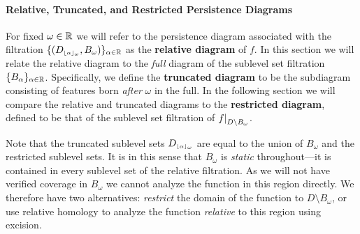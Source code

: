 
\paragraph*{Relative, Truncated, and Restricted Persistence Diagrams}

For fixed $\omega\in\mathbb{R}$ we will refer to the persistence diagram associated with the filtration $\{(D_{\scriptscriptstyle \lfloor\alpha\rfloor_{\omega}}, B_\omega)\}_{\alpha\in\mathbb{R}}$  as the \textbf{relative diagram} of $f$.
In this section we will relate the relative diagram to the \emph{full} diagram of the sublevel set filtration $\{B_\alpha\}_{\alpha\in\mathbb{R}}$.
Specifically, we define the \textbf{truncated diagram} to be the subdiagram consisting of features born \emph{after} $\omega$ in the full.
In the following section we will compare the relative and truncated diagrams to the \textbf{restricted diagram}, defined to be that of the sublevel set filtration of $f\mathord{\mid}_{D\setminus B_\omega}$.%

Note that the truncated sublevel sets $D_{\scriptscriptstyle \lfloor\alpha\rfloor_{\omega}}$ are equal to the union of $B_\omega$ and the restricted sublevel sets.
It is in this sense that $B_\omega$ is \emph{static} throughout---it is contained in every sublevel set of the relative filtration.
As we will not have verified coverage in $B_\omega$ we cannot analyze the function in this region directly.
We therefore have two alternatives: \emph{restrict} the domain of the function to $D\setminus B_\omega$, or use relative homology to analyze the function \emph{relative} to this region using excision.

